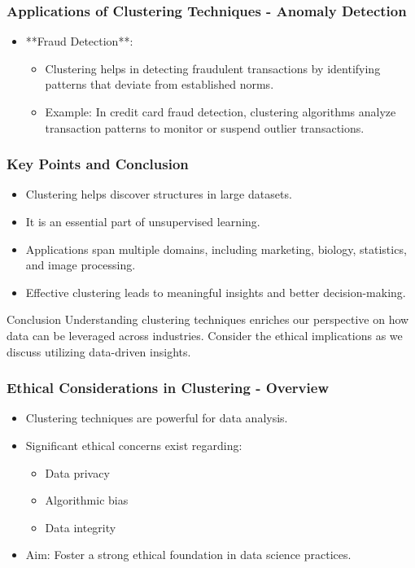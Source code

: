 \documentclass[aspectratio=169]{beamer}
\begin{document}
\begin{frame}[fragile]
    \frametitle{Applications of Clustering Techniques - Anomaly Detection}
    \begin{itemize}
        \item **Fraud Detection**:
        \begin{itemize}
            \item Clustering helps in detecting fraudulent transactions by identifying patterns that deviate from established norms.
            \item Example: In credit card fraud detection, clustering algorithms analyze transaction patterns to monitor or suspend outlier transactions.
        \end{itemize}
    \end{itemize}
\end{frame}

\begin{frame}[fragile]
    \frametitle{Key Points and Conclusion}
    \begin{itemize}
        \item Clustering helps discover structures in large datasets.
        \item It is an essential part of unsupervised learning.
        \item Applications span multiple domains, including marketing, biology, statistics, and image processing.
        \item Effective clustering leads to meaningful insights and better decision-making.
    \end{itemize}
    \begin{block}{Conclusion}
        Understanding clustering techniques enriches our perspective on how data can be leveraged across industries. Consider the ethical implications as we discuss utilizing data-driven insights.
    \end{block}
\end{frame}

\begin{frame}[fragile]
    \frametitle{Ethical Considerations in Clustering - Overview}
    \begin{itemize}
        \item Clustering techniques are powerful for data analysis.
        \item Significant ethical concerns exist regarding:
            \begin{itemize}
                \item Data privacy
                \item Algorithmic bias
                \item Data integrity
            \end{itemize}
        \item Aim: Foster a strong ethical foundation in data science practices.
    \end{itemize}
\end{frame}
\end{document}
